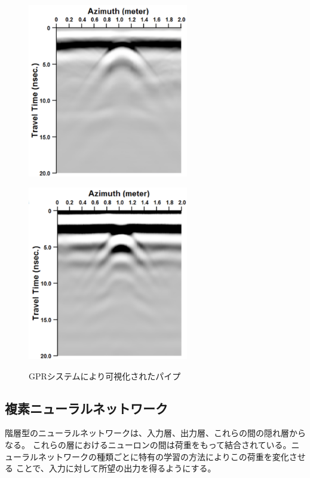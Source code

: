\documentclass[11pt,a4paper,uplatex,draft]{ujarticle}
\begin{document}
    \begin{figure}[htbp]
      \centering
      \begin{minipage}[b]{0.45\hsize}
        \centering
        \includegraphics[keepaspectratio, width=70mm]{Images/SFCW_Kido.png}
        \label{SFCW_Kido}
      \end{minipage}
      \begin{minipage}[b]{0.45\hsize}
        \centering
        \includegraphics[keepaspectratio, width=70mm]{Images/pulse_Kido.png}
        \label{pulse_Kido}
      \end{minipage}
      \caption{GPRシステムにより可視化されたパイプ\cite{STFW_Kido}}\label{fig:GPR_raw_data}
    \end{figure}

  \subsection{複素ニューラルネットワーク}

    階層型のニューラルネットワークは、入力層、出力層、これらの間の隠れ層からなる。
    これらの層におけるニューロンの間は荷重をもって結合されている。ニューラルネットワークの種類ごとに特有の学習の方法によりこの荷重を変化させる
    ことで、入力に対して所望の出力を得るようにする。
\end{document}
